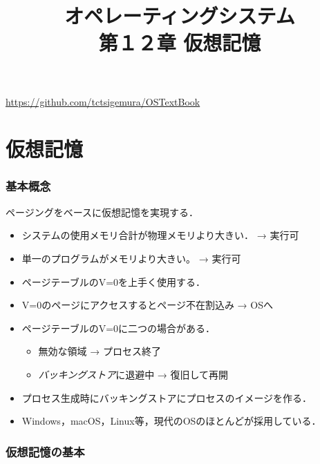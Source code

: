 \documentclass[unicode,handout]{beamer}                   %
\begin{document}
\title[仮想記憶]{オペレーティングシステム\\第１２章 仮想記憶}
\date{}
\begin{frame}
  \titlepage
  \centerline{\url{https://github.com/tctsigemura/OSTextBook}}
\end{frame}


\section{仮想記憶}
\begin{frame}
  \frametitle{基本概念}
  ページングをベースに仮想記憶を実現する．
  \begin{itemize}
  \item システムの使用メモリ合計が物理メモリより大きい． → 実行可
  \item 単一のプログラムがメモリより大きい。 → 実行可
  \item ページテーブルのV=0を上手く使用する．
  \item V=0のページにアクセスするとページ不在割込み → OSへ
  \item ページテーブルのV=0に二つの場合がある．
    \begin{itemize}
      \item[1.] 無効な領域 → プロセス終了
      \item[2.] \emph{バッキングストア}に退避中 → 復旧して再開
    \end{itemize}
  \item プロセス生成時にバッキングストアにプロセスのイメージを作る．
  \item Windows，macOS，Linux等，現代のOSのほとんどが採用している．
  \end{itemize}
\end{frame}

\begin{frame}
  \frametitle{仮想記憶の基本}
\end{frame}
\end{document}
